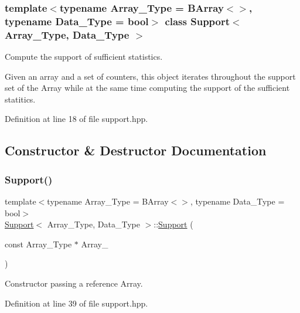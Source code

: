 \subsubsection*{template$<$typename Array\+\_\+\+Type = B\+Array$<$$>$, typename Data\+\_\+\+Type = bool$>$\newline
class Support$<$ Array\+\_\+\+Type, Data\+\_\+\+Type $>$}

Compute the support of sufficient statistics. 

Given an array and a set of counters, this object iterates throughout the support set of the Array while at the same time computing the support of the sufficient statitics. 

Definition at line 18 of file support.\+hpp.



\subsection{Constructor \& Destructor Documentation}
\mbox{\label{class_support_a4a0587bc6f1f268005a94fea039ea6ba}} 
\subsubsection{\texorpdfstring{Support()}{Support()}\hspace{0.1cm}{\footnotesize\ttfamily [1/2]}}
{\footnotesize\ttfamily template$<$typename Array\+\_\+\+Type = B\+Array$<$$>$, typename Data\+\_\+\+Type = bool$>$ \\
\hyperlink{class_support}{Support}$<$ Array\+\_\+\+Type, Data\+\_\+\+Type $>$\+::\hyperlink{class_support}{Support} (\begin{DoxyParamCaption}\item[{const Array\+\_\+\+Type $\ast$}]{Array\+\_\+ }\end{DoxyParamCaption})\hspace{0.3cm}{\ttfamily [inline]}}



Constructor passing a reference Array. 



Definition at line 39 of file support.\+hpp.

\mbox{\label{class_support_aff7d2705d6f765fcbd8958453b7dbefe}} 
